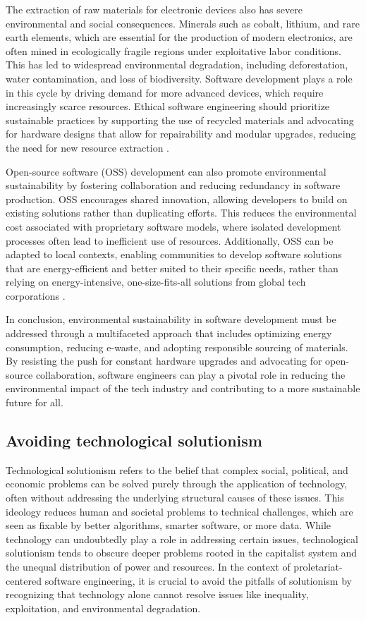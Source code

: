 \begin{refsection}
The extraction of raw materials for electronic devices also has severe environmental and social consequences. Minerals such as cobalt, lithium, and rare earth elements, which are essential for the production of modern electronics, are often mined in ecologically fragile regions under exploitative labor conditions. This has led to widespread environmental degradation, including deforestation, water contamination, and loss of biodiversity. Software development plays a role in this cycle by driving demand for more advanced devices, which require increasingly scarce resources. Ethical software engineering should prioritize sustainable practices by supporting the use of recycled materials and advocating for hardware designs that allow for repairability and modular upgrades, reducing the need for new resource extraction \cite[pp.~85-87]{benkler2010}.

Open-source software (OSS) development can also promote environmental sustainability by fostering collaboration and reducing redundancy in software production. OSS encourages shared innovation, allowing developers to build on existing solutions rather than duplicating efforts. This reduces the environmental cost associated with proprietary software models, where isolated development processes often lead to inefficient use of resources. Additionally, OSS can be adapted to local contexts, enabling communities to develop software solutions that are energy-efficient and better suited to their specific needs, rather than relying on energy-intensive, one-size-fits-all solutions from global tech corporations \cite[pp.~102-104]{weber2005}.

In conclusion, environmental sustainability in software development must be addressed through a multifaceted approach that includes optimizing energy consumption, reducing e-waste, and adopting responsible sourcing of materials. By resisting the push for constant hardware upgrades and advocating for open-source collaboration, software engineers can play a pivotal role in reducing the environmental impact of the tech industry and contributing to a more sustainable future for all.

\subsection{Avoiding technological solutionism}

Technological solutionism refers to the belief that complex social, political, and economic problems can be solved purely through the application of technology, often without addressing the underlying structural causes of these issues. This ideology reduces human and societal problems to technical challenges, which are seen as fixable by better algorithms, smarter software, or more data. While technology can undoubtedly play a role in addressing certain issues, technological solutionism tends to obscure deeper problems rooted in the capitalist system and the unequal distribution of power and resources. In the context of proletariat-centered software engineering, it is crucial to avoid the pitfalls of solutionism by recognizing that technology alone cannot resolve issues like inequality, exploitation, and environmental degradation.


\end{refsection}
